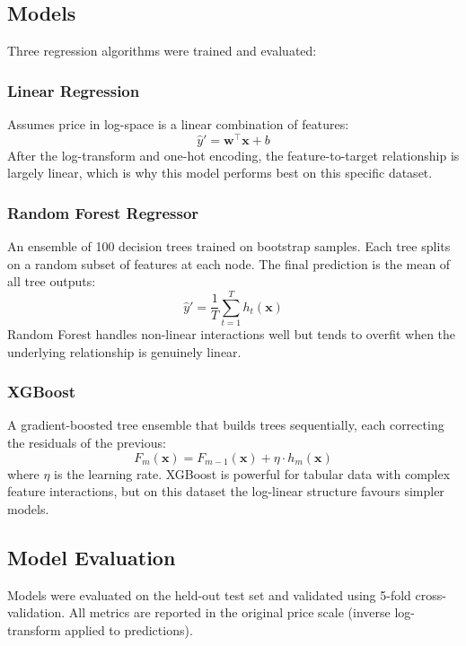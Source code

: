 \documentclass[12pt, a4paper]{article}
\begin{document}
\subsection{Models}

Three regression algorithms were trained and evaluated:

\subsubsection{Linear Regression}
Assumes price in log-space is a linear combination of features:
\[
  \hat{y}' = \mathbf{w}^\top \mathbf{x} + b
\]
After the log-transform and one-hot encoding, the feature-to-target relationship
is largely linear, which is why this model performs best on this specific dataset.

\subsubsection{Random Forest Regressor}
An ensemble of 100 decision trees trained on bootstrap samples. Each tree splits
on a random subset of features at each node. The final prediction is the mean of
all tree outputs:
\[
  \hat{y}' = \frac{1}{T} \sum_{t=1}^{T} h_t(\mathbf{x})
\]
Random Forest handles non-linear interactions well but tends to overfit when the
underlying relationship is genuinely linear.

\subsubsection{XGBoost}
A gradient-boosted tree ensemble that builds trees sequentially, each correcting
the residuals of the previous:
\[
  F_m(\mathbf{x}) = F_{m-1}(\mathbf{x}) + \eta \cdot h_m(\mathbf{x})
\]
where $\eta$ is the learning rate. XGBoost is powerful for tabular data with
complex feature interactions, but on this dataset the log-linear structure favours
simpler models.

\subsection{Model Evaluation}

Models were evaluated on the held-out test set and validated using 5-fold
cross-validation. All metrics are reported in the original price scale (inverse
log-transform applied to predictions).
\end{document}
